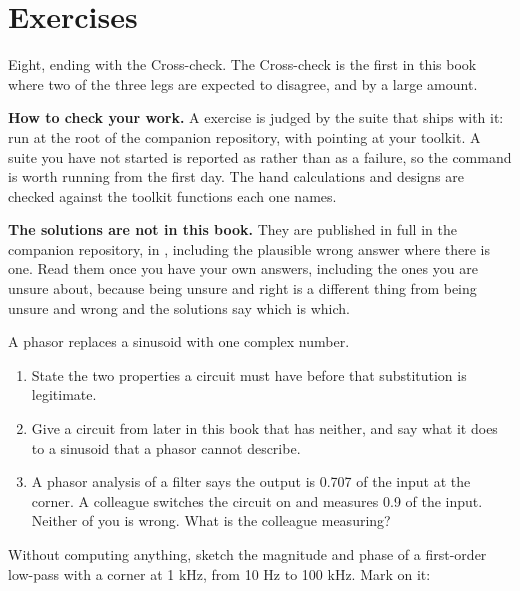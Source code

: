 
\section{Exercises}
\label{c2:sec:exercises}

Eight, ending with the Cross-check. The Cross-check is the first in this book where two of the three legs are expected to disagree, and by a large amount.

\begin{aside}
\textbf{How to check your work.} A  exercise is judged by the suite that ships with it: run  at the root of the companion repository, with  pointing at your toolkit. A suite you have not started is reported as  rather than as a failure, so the command is worth running from the first day. The hand calculations and designs are checked against the toolkit functions each one names.

\textbf{The solutions are not in this book.} They are published in full in the companion repository, in , including the plausible wrong answer where there is one. Read them once you have your own answers, including the ones you are unsure about, because being unsure and right is a different thing from being unsure and wrong and the solutions say which is which.
\end{aside}

\label{c2:ex:1}
A phasor replaces a sinusoid with one complex number.

\begin{enumerate}
  \item State the two properties a circuit must have before that substitution is legitimate.
  \item Give a circuit from later in this book that has neither, and say what it does to a sinusoid that a phasor cannot describe.
  \item A phasor analysis of a filter says the output is 0.707 of the input at the corner. A colleague switches the circuit on and measures 0.9 of the input. Neither of you is wrong. What is the colleague measuring?
\end{enumerate}

\label{c2:ex:2}
Without computing anything, sketch the magnitude and phase of a first-order low-pass with a corner at 1 kHz, from 10 Hz to 100 kHz. Mark on it:

